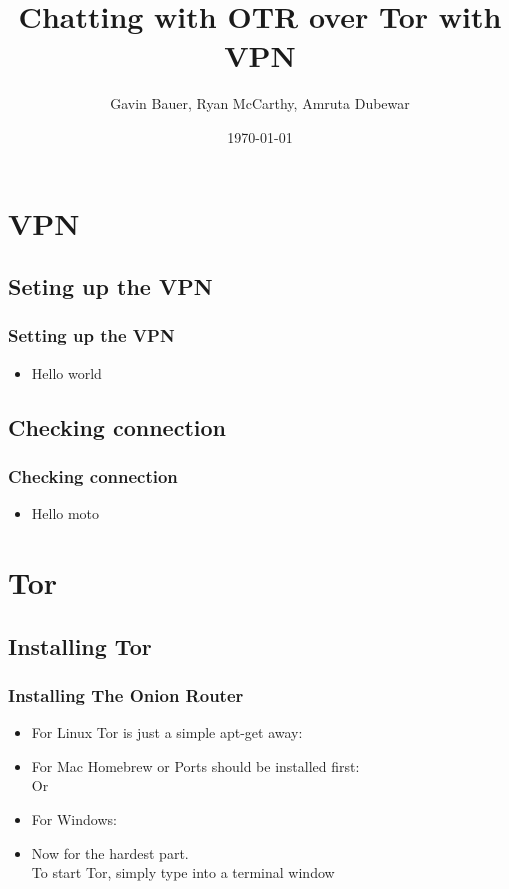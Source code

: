 \documentclass{beamer}
\title{Chatting with OTR over Tor with VPN}
\author{Gavin Bauer, Ryan McCarthy, Amruta Dubewar}
\date{\today}
\begin{document}
\begin{frame}
\maketitle
\end{frame}
\section{VPN}
\subsection{Seting up the VPN}
\begin{frame}
\frametitle{Setting up the VPN}
\begin{itemize}
\item Hello world
\end{itemize}
\end{frame}
\subsection{Checking connection}
\begin{frame}
\frametitle{Checking connection}
\begin{itemize}
\item Hello moto
\end{itemize}
\end{frame}


\section{Tor}
\subsection{Installing Tor}
\begin{frame}
\frametitle{Installing The Onion Router}
\begin{itemize}
\item For Linux Tor is just a simple apt-get away:\\
\pause
{\color{blue}{sudo apt-get install tor}}
\pause
\item For Mac Homebrew or Ports should be installed first:\\
\pause{\color{blue}{brew install tor}} Or {\color{blue}{ports install tor}}
\pause
\item For Windows:
\pause
{\color{red}{You're on your own...}}
\pause
\item Now for the hardest part. \\To start Tor, simply type {\color{blue}{tor}} into a terminal window

\end{itemize}
\end{frame}
\end{document}
